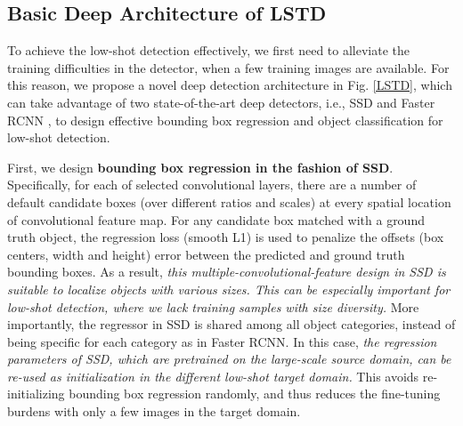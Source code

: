 \documentclass[letterpaper]{article} \usepackage{aaai18}  \usepackage{times}  \usepackage{helvet}  \usepackage{courier}  \usepackage{url}  \usepackage{graphicx}
\begin{document}
\subsection{Basic Deep Architecture of LSTD}
\label{Basic Deep Architecture of LSTD}

To achieve the low-shot detection effectively,
we first need to alleviate the training difficulties in the detector,
when a few training images are available.
For this reason,
we propose a novel deep detection architecture in Fig. \ref{LSTD},
which can take advantage of two state-of-the-art deep detectors,
i.e.,
SSD \cite{Liueccv2016} and Faster RCNN \cite{Renpami2016},
to design effective bounding box regression and object classification for low-shot detection.


First,
we design \textbf{bounding box regression in the fashion of SSD}.
Specifically,
for each of selected convolutional layers,
there are a number of default candidate boxes (over different ratios and scales) at every spatial location of convolutional feature map.
For any candidate box matched with a ground truth object,
the regression loss (smooth L1) is used to penalize the offsets (box centers, width and height) error between the predicted and ground truth bounding boxes.
As a result,
\textit{this multiple-convolutional-feature design in SSD is suitable to localize objects with various sizes.
This can be especially important for low-shot detection,
where we lack training samples with size diversity.}
More importantly,
the regressor in SSD is shared among all object categories,
instead of being specific for each category as in Faster RCNN.
In this case,
\textit{the regression parameters of SSD, which are pretrained on the large-scale source domain, can be re-used as initialization in the different low-shot target domain.}
This avoids re-initializing bounding box regression randomly,
and thus reduces the fine-tuning burdens with only a few images in the target domain.
\end{document}
